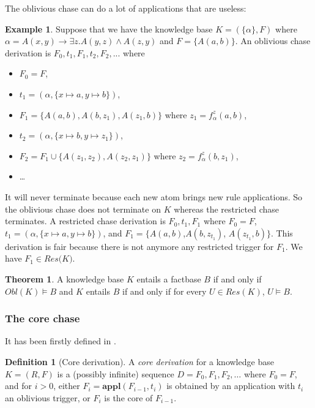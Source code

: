 \documentclass{article}
\theoremstyle{definition}
\newtheorem{definition}{Definition}[section]
\newtheorem{theorem}{Theorem}[section]
\newtheorem{example}{Example}[section]
\theoremstyle{remark}
\newcommand{\Appl}{\textbf{appl}}
\begin{document}
The oblivious chase  can do a lot of applications that are useless: 
\begin{example}
Suppose that we have the knowledge base $K=(\{\alpha\},F)$ where $\alpha = A(x,y) \rightarrow \exists z.A(y,z) \wedge A(z,y)$ and $F =  \{A(a,b)\}$. An oblivious chase derivation is $F_0,t_1,F_1,t_2,F_2,...$ where
\begin{itemize}
\item $F_0 = F$, 
\item $t_1=(\alpha,\{x \mapsto a, y \mapsto b\})$, 
\item $F_1=\{A(a,b),A(b,z_1),A(z_1,b)\}$ where $z_1 =f_\alpha^z(a,b)$,
\item $t_2=(\alpha,\{x \mapsto b, y \mapsto z_1\})$, 
\item $F_2=F_1 \cup \{ A(z_1,z_2), A(z_2,z_1)\}$ where $z_2= f_\alpha^z(b,z_1)$, 
\item \ldots\ 
\end{itemize} 
It will never terminate because each new atom brings new rule applications. So the oblivious chase does not terminate on $K$ whereas the restricted chase terminates. A restricted chase derivation is $F_0,t_1,F_1$ where $F_0 = F$, $t_1=(\alpha,\{x \mapsto a, y \mapsto b\})$, and $F_1=\{A(a,b)$,$A(b,z_{t_1})$, $A(z_{t_1},b)\}$. This derivation is fair because there is not anymore any restricted trigger for $F_1$. We have $F_1 \in \textit{Res(K)}$.
\end{example}




\begin{theorem}
A knowledge base $K$ entails a factbase $B$ if and only if $\textit{Obl}(K) \models B$ and $K$ entails $B$ if and only if for every $U \in \textit{Res}(K)$, $U \models B$.
\end{theorem}




\subsubsection{The core chase}

It has been firstly defined in \cite{core_chase}.

\begin{definition}[Core derivation]
A \emph{core derivation} for a knowledge base $K = (R,F)$ is a (possibly infinite) sequence $D = F_0, F_1, F_2, \ldots$ where $F_0 = F$, and for $i >0$, either $F_{i}= \Appl(F_{i-1},t_i)$ is obtained by an application with $t_i$ an oblivious trigger, or $F_i$ is the core of $F_{i-1}$. 
\end{definition} 
\end{document}
